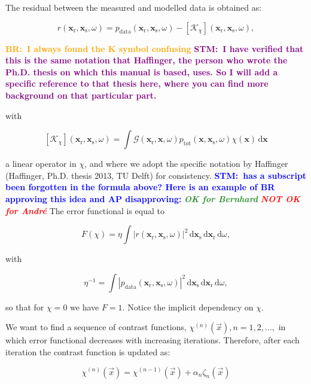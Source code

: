 \documentclass[10pt,a4paper]{article}
\newcommand{\df}[1]{\, \ensuremath{\mbox{d}#1}}
\newcommand{\commentstm}[1]{\textcolor{blue}{\textbf{STM:\ #1}}}
\newcommand{\commentstmtwo}[1]{\textcolor{purple}{\textbf{STM:\ #1}}}
\newcommand{\brok}{\textcolor{ForestGreen}{\textit{\textbf{OK for Bernhard}}}}
\newcommand{\apnok}{\textcolor{red}{\textit{\textbf{NOT OK for Andr\'{e}}}}}
\newcommand{\commentbr}[1]{\textcolor{orange}{\textbf{BR:\ #1}}}
\newcommand{\xs}{\mathbf{x}_\text{s}}
\newcommand{\xr}{\mathbf{x}_\text{r}}
\newcommand{\x}{\mathbf{x}}
\begin{document}
The residual between the measured and modelled data is obtained as:

\begin{equation} \label{eq:eq9} r(\xr, \xs, \omega) = p_{\text{data}}(\xr, \xs, \omega) - \left[\mathcal{K}_\chi \right](\xr, \xs, \omega), \end{equation}

\commentbr{I always found the K symbol confusing}
\commentstmtwo{I have verified that this is the same notation that Haffinger, the person who wrote the Ph.D. thesis on which this manual is based, uses. So I will add a specific reference to that thesis here, where you can find more background on that particular part.}

with

\begin{equation} \label{eq:eq10} \left[\mathcal{K}_\chi \right](\xr, \xs, \omega) = \int \mathcal{G}(\xr, \x, \omega) p_\text{tot}(\x, \xs, \omega) \chi(\x) \df{\x} \end{equation}

a linear operator in $\chi$, and where we adopt the specific notation by Haffinger (Haffinger, Ph.D. thesis 2013, TU Delft) for consistency.
\commentstm{has a subscript been forgotten in the formula above? Here is an example of BR approving this idea and AP disapproving: }
{\brok}
{\apnok}
The error functional is equal to

\begin{equation} \label{eq:eq11} F(\chi) = \eta \int |r(\xr, \xs, \omega)|^2 \df{\mathbf{x}_\text{s}} \df{\xr} \df{\omega},\end{equation}

with

\begin{equation} \label{eq:eq12} \eta^{-1} = \int | p_\text{data}(\xr, \xs, \omega) |^2 \df{\xs} \df{\xr} \df{\omega}, \end{equation}

so that for $\chi = 0$ we have $F = 1$. Notice the implicit dependency on $\chi$.

We want to find a sequence of contrast functions, $\chi^{(n)}(\vec{x}), n = 1,2,...,$ in which error functional decreases with increasing iterations. Therefore, after each iteration the contrast function is updated as:

\begin{equation} \label{eq:eq13} \chi^{(n)}(\vec{x}) =  \chi^{(n-1)}(\vec{x}) + \alpha_n\zeta_n(\vec{x}) \end{equation}
\end{document}
